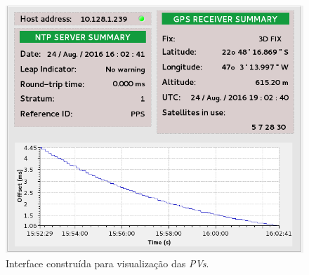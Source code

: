 \begin{frame}
\begin{columns}
\begin{column}{.5\textwidth}
\begin{figure}[h]
    \centering
    \includegraphics[width=\textwidth]{image/epics-opi-ntpgps}
    \caption {Interface construída para visualização das
    \textit{PVs}.}
    \label{img:ntp-opi} 
\end{figure}
\end{column} 
\end{columns}

\end{frame}